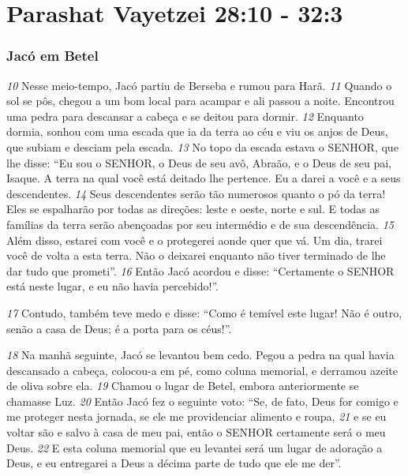 \section*{Parashat Vayetzei 28:10 - 32:3}

\subsubsection*{Jacó em Betel}

\textit{\tiny 10}
Nesse meio-tempo, Jacó partiu de Berseba e rumou para Harã. 
\textit{\tiny 11}
Quando o sol
se pôs, chegou a um bom local para acampar e ali passou a noite. Encontrou uma
pedra para descansar a cabeça e se deitou para dormir. 
\textit{\tiny 12}
Enquanto dormia,
sonhou com uma escada que ia da terra ao céu e viu os anjos de Deus, que subiam
e desciam pela escada.
\textit{\tiny 13}
No topo da escada estava o SENHOR, que lhe disse: “Eu sou o SENHOR, o Deus de
seu avô, Abraão, e o Deus de seu pai, Isaque. A terra na qual você está deitado lhe
pertence. Eu a darei a você e a seus descendentes. 
\textit{\tiny 14}
Seus descendentes serão tão
numerosos quanto o pó da terra! Eles se espalharão por todas as direções: leste e
oeste, norte e sul. E todas as famílias da terra serão abençoadas por seu
intermédio e de sua descendência. 
\textit{\tiny 15}
Além disso, estarei com você e o protegerei
aonde quer que vá. Um dia, trarei você de volta a esta terra. Não o deixarei
enquanto não tiver terminado de lhe dar tudo que prometi”.
\textit{\tiny 16}
Então Jacó acordou e disse: “Certamente o SENHOR está neste lugar, e eu não
havia percebido!”. 

\bigskip
\textit{\tiny 17}
Contudo, também teve medo e disse: “Como é temível este
lugar! Não é outro, senão a casa de Deus; é a porta para os céus!”.

\bigskip
\textit{\tiny 18}
Na manhã seguinte, Jacó se levantou bem cedo. Pegou a pedra na qual havia
descansado a cabeça, colocou-a em pé, como coluna memorial, e derramou azeite
de oliva sobre ela. 
\textit{\tiny 19}
Chamou o lugar de Betel, embora anteriormente se
chamasse Luz.
\textit{\tiny 20}
Então Jacó fez o seguinte voto: “Se, de fato, Deus for comigo e me proteger
nesta jornada, se ele me providenciar alimento e roupa, 
\textit{\tiny 21}
e se eu voltar são e salvo
à casa de meu pai, então o SENHOR certamente será o meu Deus. 
\textit{\tiny 22}
E esta coluna
memorial que eu levantei será um lugar de adoração a Deus, e eu entregarei a
Deus a décima parte de tudo que ele me der”.

